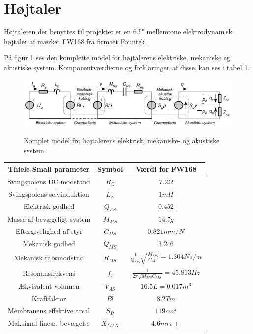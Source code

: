 \section{Højtaler}

Højtaleren der benyttes til projektet er en 6.5" mellemtone elektrodynamisk højtaler af mærket FW168\cite{FW168} fra firmaet Fountek \cite{Fountek}. 

På figur \ref{fig:kompletmodel} ses den komplette model for højtalerens elektriske, mekaniske og akustiske system.\citep{Elektroakustik} Komponentværdierne og forklaringen af disse, kan ses i tabel \ref{tab:TS}.

\begin{figure}[H]
	\centering
	\includegraphics[width=\textwidth]{Pics/kompletmodel.PNG}
	\label{fig:kompletmodel}
	\caption{Komplet model fro højtalerens elektrisk, mekaniske- og akustiske system. } 
\end{figure}

\begin{table}
	\centering
	\begin{tabular}[C]{|c|c|c|}
		
		
		\hline	
		\textbf{Thiele-Small parameter} & \textbf{Symbol} & \textbf{Værdi for FW168} \\\hline
		Svingspolens DC modstand & $R_E$ & $7.2\Omega$ \\\hline
		Svingspolens selvinduktion & $L_E$ & $1mH$  \\\hline
		Elektrisk godhed & $Q_{ES}$ & 0.452 \\\hline
		Masse af bevægeligt system & $M_{MS}$ & $14.7g$  \\\hline
		Eftergivelighed af styr & $C_{MS}$ & $0.821mm/N$  \\\hline
		Mekanisk godhed & $Q_{MS}$ & 3.246  \\\hline
		Mekanisk tabsmodstnd & $R_{MS}$ & \( \frac{1}{Q_{MS}}\sqrt{\frac{M_{MS}}{C_{MS}}}=1.304Ns/m \)  \\\hline
		Resonansfrekvens & $f_s$ & \( \frac{1}{2\pi\sqrt{M_{MS} C_{MS}}}=45.813Hz \) \\\hline
		
		
		Ækvivalent volumen & $ V_{AS} $ & $16.5L=0.017m^3$ \\\hline
		Kraftfaktor & $Bl$ & $8.2Tm$ \\\hline
		Membranens effektive areal & $S_D$ & $119cm^2$ \\\hline
		Maksimal lineær bevægelse & $X_{MAX}$ & $4.6mm\pm$ \\\hline
		
	\end{tabular}
	\label{tab:TS}
\end{table}

